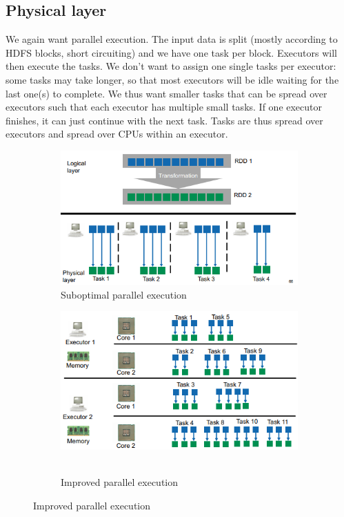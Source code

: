 \documentclass[11pt,oneside,a4paper]{article}
\begin{document}
\subsection{Physical layer}

We again want parallel execution. The input data is split (mostly according to HDFS blocks, short circuiting) and we have one task per block. Executors will then execute the tasks. We don't want to assign one single tasks per executor: some tasks may take longer, so that most executors will be idle waiting for the last one(s) to complete. We thus want smaller tasks that can be spread over executors such that each executor has multiple small tasks. If one executor finishes, it can just continue with the next task. Tasks are thus spread over executors and spread over CPUs within an executor. 

\begin{figure}[t!]
	\centering
	\begin{subfigure}[t]{.5\textwidth}
		\centering
		\includegraphics[width=0.7\linewidth]{figures/spark_parallelize_not_ideal}
		\caption{Suboptimal parallel execution }
	\end{subfigure}%
	\begin{subfigure}[t]{.5\textwidth}
		\centering
		\includegraphics[width=0.7\linewidth]{figures/spark_parallelize_ideal}\
		\caption{Improved parallel execution}
	\end{subfigure}
\end{figure}
\end{document}
